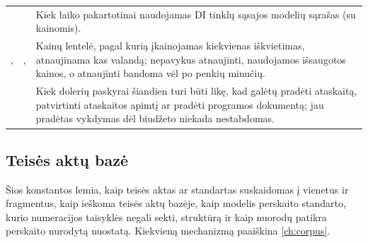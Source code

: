 \begin{xltabular}{\textwidth}{@{}L{44mm}L{19mm}Y@{}}
 &  & Kiek laiko pakartotinai naudojamas DI tinklų sąsajos modelių sąrašas (su kainomis). \\
,  & ,  & Kainų lentelė, pagal kurią įkainojamas kiekvienas iškvietimas, atnaujinama kas valandą; nepavykus atnaujinti, naudojamos išsaugotos kainos, o atnaujinti bandoma vėl po penkių minučių. \\
 &  & Kiek dolerių paskyrai šiandien turi būti likę, kad galėtų pradėti ataskaitą, patvirtinti ataskaitos apimtį ar pradėti programos dokumentą; jau pradėtas vykdymas dėl biudžeto niekada nestabdomas. \\
\end{xltabular}


\subsection{Teisės aktų bazė}\label{sec:config:corpus}

Šios konstantos lemia, kaip teisės aktas ar standartas suskaidomas į vienetus ir fragmentus, kaip
ieškoma teisės aktų bazėje, kaip modelis perskaito standarto, kurio numeracijos taisyklės negali
sekti, struktūrą ir kaip nuorodų patikra perskaito nurodytą nuostatą. Kiekvieną mechanizmą
paaiškina \cref{ch:corpus}.

